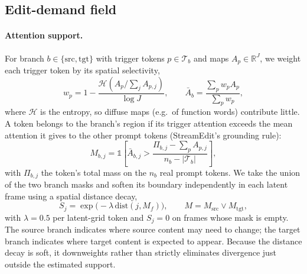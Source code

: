 \documentclass[10pt,twocolumn]{article}
\newcommand{\src}{\mathrm{src}}
\newcommand{\tgt}{\mathrm{tgt}}
\begin{document}
\subsection{Edit-demand field}
\label{sec:demand}

\paragraph{Attention support.}
For branch $b\in\{\src,\tgt\}$ with trigger tokens $p\in\mathcal{T}_b$ and maps $A_p\in\mathbb{R}^{J}$, we weight each trigger token by its spatial selectivity,
\begin{equation}
w_p = 1 - \frac{\mathcal{H}\!\left(A_p/\textstyle\sum_{j}A_{p,j}\right)}{\log J},\qquad
\bar A_b = \frac{\sum_{p} w_p A_p}{\sum_p w_p},
\end{equation}
where $\mathcal{H}$ is the entropy, so diffuse maps (e.g.\ of function words) contribute little. A token belongs to the branch's region if its trigger attention exceeds the mean attention it gives to the other prompt tokens (StreamEdit's grounding rule):
\begin{equation}
M_{b,j} = \mathbb{1}\!\left[\bar A_{b,j} > \frac{\Pi_{b,j}-\sum_{p}A_{p,j}}{n_b - |\mathcal{T}_b|}\right],
\end{equation}
with $\Pi_{b,j}$ the token's total mass on the $n_b$ real prompt tokens. We take the union of the two branch masks and soften its boundary independently in each latent frame using a spatial distance decay,
\begin{equation}
S_j = \exp\!\big(-\lambda\,\mathrm{dist}(j, M_f)\big),\qquad M = M_{\src}\lor M_{\tgt},
\end{equation}
with $\lambda=0.5$ per latent-grid token and $S_j=0$ on frames whose mask is empty. The source branch indicates where source content may need to change; the target branch indicates where target content is expected to appear. Because the distance decay is soft, it downweights rather than strictly eliminates divergence just outside the estimated support.
\end{document}
